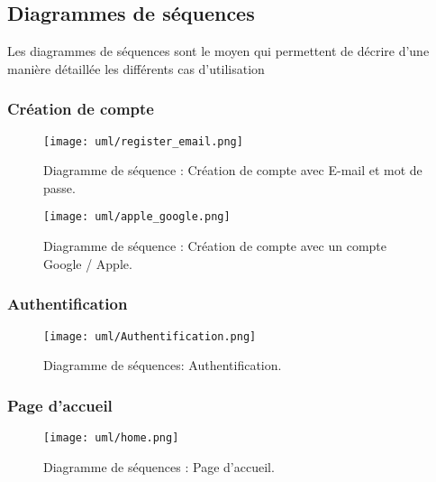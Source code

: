 \subsection{Diagrammes de séquences}
Les diagrammes de séquences sont le moyen qui permettent de décrire d'une manière détaillée les différents cas d'utilisation
\subsubsection{Création de compte}
\begin{figure}[H]
    \centering
    \texttt{[image: uml/register\_email.png]}
    \vspace{1cm}
    \captionsetup{justification=centering}

    \caption{Diagramme de séquence : Création de compte avec E-mail et mot de passe.}
    \label{fig:seq_register_email}
\end{figure}
\begin{figure}[H]
    \centering
    \texttt{[image: uml/apple\_google.png]}
    \vspace{1cm}
    \captionsetup{justification=centering}

    \caption{Diagramme de séquence : Création de compte avec un compte Google / Apple.}
    \label{fig:seq_register_apple_google}
\end{figure}
\subsubsection{Authentification}
\begin{center}
    \begin{figure}[H]
        \centering
        \texttt{[image: uml/Authentification.png]}
        \vspace{1cm}
        \captionsetup{justification=centering}

        \caption{Diagramme de séquences: Authentification.}
        \label{fig:seq_auth}
    \end{figure}
\end{center}
\subsubsection{Page d'accueil}
\begin{figure}[H]
    \centering
    \texttt{[image: uml/home.png]}
    \vspace{1cm}
    \caption{Diagramme de séquences : Page d'accueil.}
    \label{fig:seq_home}
\end{figure}
